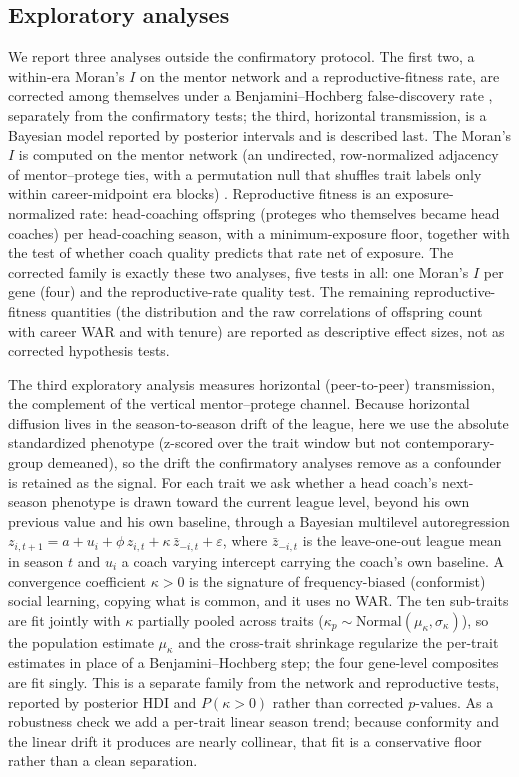 \documentclass[
  journal=ehs,
  manuscript=article,
  year=2026,
  volume=8,
]{cup-journal}
\begin{document}
\subsection{Exploratory analyses}
We report three analyses outside the confirmatory protocol. The first two, a
within-era Moran's $I$ on the mentor network and a reproductive-fitness rate, are
corrected among themselves under a Benjamini--Hochberg false-discovery rate
\parencite{benjamini1995}, separately from the confirmatory tests; the third,
horizontal transmission, is a Bayesian model reported by posterior intervals and is
described last. The Moran's $I$ is computed on the mentor network (an undirected,
row-normalized adjacency of mentor--protege ties, with a permutation null that
shuffles trait labels only within career-midpoint era blocks) \parencite{moran1950}.
Reproductive fitness is an exposure-normalized rate: head-coaching offspring (proteges
who themselves became head coaches) per head-coaching season, with a minimum-exposure
floor, together with the test of whether coach quality predicts that rate net of
exposure. The corrected family is exactly these two analyses, five tests in all: one
Moran's $I$ per gene (four) and the reproductive-rate quality test. The remaining
reproductive-fitness quantities (the distribution and the raw correlations of offspring
count with career WAR and with tenure) are reported as descriptive effect sizes, not
as corrected hypothesis tests.

The third exploratory analysis measures horizontal (peer-to-peer) transmission, the
complement of the vertical mentor--protege channel. Because horizontal diffusion
lives in the season-to-season drift of the league, here we use the absolute
standardized phenotype (z-scored over the trait window but not contemporary-group
demeaned), so the drift the confirmatory analyses remove as a confounder is retained
as the signal. For each trait we ask whether a head coach's next-season phenotype is
drawn toward the current league level, beyond his own previous value and his own
baseline, through a Bayesian multilevel autoregression
$z_{i,t+1}=a+u_{i}+\phi\,z_{i,t}+\kappa\,\bar z_{-i,t}+\varepsilon$, where
$\bar z_{-i,t}$ is the leave-one-out league mean in season $t$ and $u_{i}$ a coach
varying intercept carrying the coach's own baseline. A convergence coefficient
$\kappa>0$ is the signature of frequency-biased (conformist) social learning, copying
what is common, and it uses no WAR. The ten sub-traits are fit jointly with $\kappa$
partially pooled across traits ($\kappa_{p}\sim\mathrm{Normal}(\mu_{\kappa},
\sigma_{\kappa})$), so the population estimate $\mu_{\kappa}$ and the cross-trait
shrinkage regularize the per-trait estimates in place of a Benjamini--Hochberg step;
the four gene-level composites are fit singly. This is a separate family from the
network and reproductive tests, reported by posterior HDI and $P(\kappa>0)$ rather
than corrected $p$-values. As a robustness check we add a per-trait linear season
trend; because conformity and the linear drift it produces are nearly collinear, that
fit is a conservative floor rather than a clean separation.
\end{document}
